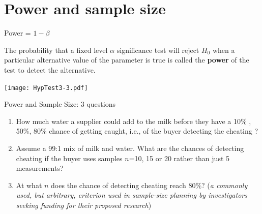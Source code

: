 \documentclass[10pt,handout]{beamer}\usepackage[]{graphicx}\usepackage[]{color}
\begin{document}
\section{Power and sample size}

\begin{frame}[fragile]{Power = $1 - \beta$}

\vspace*{-0.2in}

\begin{definition}[Power = $1-\beta$]
	The probability that a fixed level $\alpha$ significance test will reject $H_0$ when a particular alternative value of the parameter is true is called the \textbf{power} of the test to detect the alternative. 
\end{definition}


\vspace*{-0.08in}

\centering
\texttt{[image: HypTest3-3.pdf]}


\end{frame}

\begin{frame}{Power and Sample Size: 3 questions}

\begin{enumerate}
	\setlength\itemsep{1em}
	\item How much water a supplier could add to the milk before they have a 10\% , 50\%, 80\%
	chance of getting caught, i.e., of the buyer detecting the cheating ? 
	\item Assume a 99:1 mix of milk and water. What are the chances of detecting cheating if the buyer uses samples $n$=10, 15 or 20 rather than just 5 measurements? 
	\item At what $n$ does the chance of detecting cheating reach 80\%? (\textit{a commonly used, but arbitrary, criterion used in sample-size planning by investigators seeking funding for their proposed research})
\end{enumerate}

\end{frame}
\end{document}
